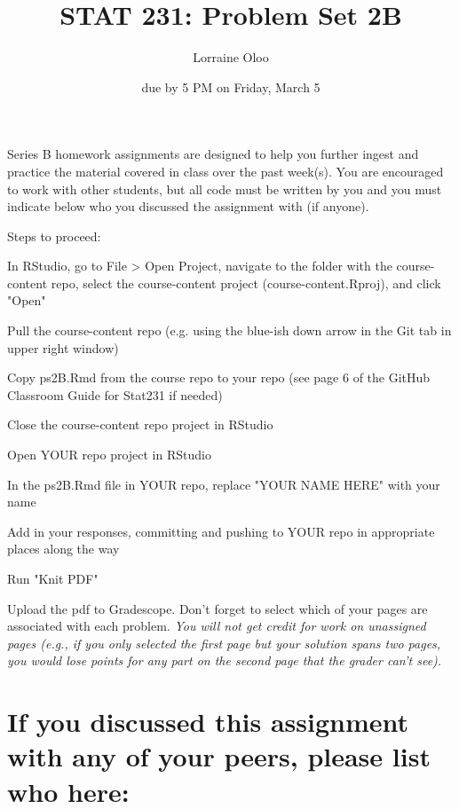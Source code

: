 \documentclass[
]{article}
\title{STAT 231: Problem Set 2B}
\author{Lorraine Oloo}
\date{due by 5 PM on Friday, March 5}
\begin{document}
\maketitle

Series B homework assignments are designed to help you further ingest
and practice the material covered in class over the past week(s). You
are encouraged to work with other students, but all code must be written
by you and you must indicate below who you discussed the assignment with
(if anyone).

Steps to proceed:

\begin{_}
\item In RStudio, go to File > Open Project, navigate to the folder with the course-content repo, select the course-content project (course-content.Rproj), and click "Open" 
\item Pull the course-content repo (e.g. using the blue-ish down arrow in the Git tab in upper right window)
\item Copy ps2B.Rmd from the course repo to your repo (see page 6 of the GitHub Classroom Guide for Stat231 if needed)
\item Close the course-content repo project in RStudio
\item Open YOUR repo project in RStudio
\item In the ps2B.Rmd file in YOUR repo, replace "YOUR NAME HERE" with your name
\item Add in your responses, committing and pushing to YOUR repo in appropriate places along the way
\item Run "Knit PDF" 
\item Upload the pdf to Gradescope.  Don't forget to select which of your pages are associated with each problem.  \textit{You will not get credit for work on unassigned pages (e.g., if you only selected the first page but your solution spans two pages, you would lose points for any part on the second page that the grader can't see).} 
\end{_}

\newpage

\hypertarget{if-you-discussed-this-assignment-with-any-of-your-peers-please-list-who-here}{%
\section{If you discussed this assignment with any of your peers, please
list who
here:}\label{if-you-discussed-this-assignment-with-any-of-your-peers-please-list-who-here}}
\end{document}
